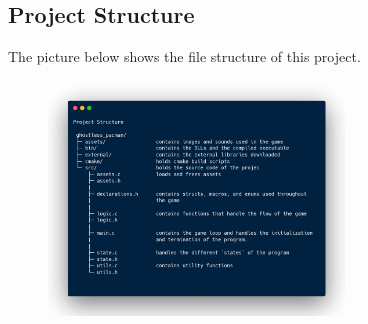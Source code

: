 \subsection{Project Structure}
The picture below shows the file structure of this project.
\begin{figure}[H]
    \begin{center}
        \includegraphics[width=0.7\textwidth]{assets/project_structure.png}
    \end{center}
\end{figure}


